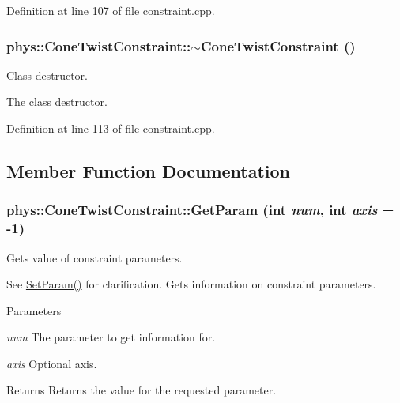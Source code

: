 Definition at line 107 of file constraint.cpp.

\hypertarget{classphys_1_1ConeTwistConstraint_aae5d4aeeff871a2ec79bdb7d493588df}{
\subsubsection[{$\sim$ConeTwistConstraint}]{\setlength{\rightskip}{0pt plus 5cm}phys::ConeTwistConstraint::$\sim$ConeTwistConstraint ()}}
\label{da/dbc/classphys_1_1ConeTwistConstraint_aae5d4aeeff871a2ec79bdb7d493588df}


Class destructor. 

The class destructor. 

Definition at line 113 of file constraint.cpp.



\subsection{Member Function Documentation}
\hypertarget{classphys_1_1ConeTwistConstraint_aab54f6c56622cef4314d3bbff194421e}{
\subsubsection[{GetParam}]{ phys::ConeTwistConstraint::GetParam (int {\em num}, \/  int {\em axis} = {\ttfamily -\/1})}}
\label{da/dbc/classphys_1_1ConeTwistConstraint_aab54f6c56622cef4314d3bbff194421e}


Gets value of constraint parameters. 

See \hyperlink{classphys_1_1ConeTwistConstraint_a555fc33b10a0c156e0ac93b94587098a}{SetParam()} for clarification. Gets information on constraint parameters. 
\begin{DoxyParams}{Parameters}
\item[{\em num}]The parameter to get information for. \item[{\em axis}]Optional axis. \end{DoxyParams}
\begin{DoxyReturn}{Returns}
Returns the value for the requested parameter. 
\end{DoxyReturn}


